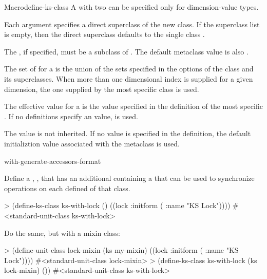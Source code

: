 \documentclass[10pt,twoside,english,pdftex]{article}
\begin{document}
\begin{functiondoc}{Macro}{define-ks-class}
\fndescription A  with two
 can be specified only for 
dimension-value types.

%
Each  argument specifies a direct superclass of the new
class. If the superclass list is empty, then the direct superclass defaults to the
single class \textbf{}.

%
The  , if specified, must be a subclass of
\textbf{}.  The default metaclass value is
also \textbf{}.


%
%
%
The set of  for a  is the
union of the sets specified in the  options
of the class and its superclasses.  When more than one dimensional
index is supplied for a given dimension, the one supplied by the most
specific class is used.

The effective  value for a
 is the value specified in the definition of the
most specific . If no definitions specify an
 value, \nil{} is used.

The  value is not inherited.  If
no value is specified in the  definition, the
default initializtion value associated with the metaclass is used.

\begin{alsos}{with-generate-accessors-format}
\also[define-ks]
\end{alsos}

\fnexamples
Define a ,
, that has an additional 
containing a  that can be used to synchronize
operations on each defined  of that class.
\begin{example}
> (define-ks-class ks-with-lock ()
    ((lock :initform ( :name "KS Lock"))))
#<standard-unit-class ks-with-lock>
\end{example}

Do the same, but with a mixin class:
\begin{example}
> (define-unit-class lock-mixin (ks my-mixin)
    ((lock :initform ( :name "KS Lock"))))
#<standard-unit-class lock-mixin>
> (define-ks-class ks-with-lock (ks lock-mixin)
    ())
#<standard-unit-class ks-with-lock>
\end{example}

\end{functiondoc}
\end{document}
